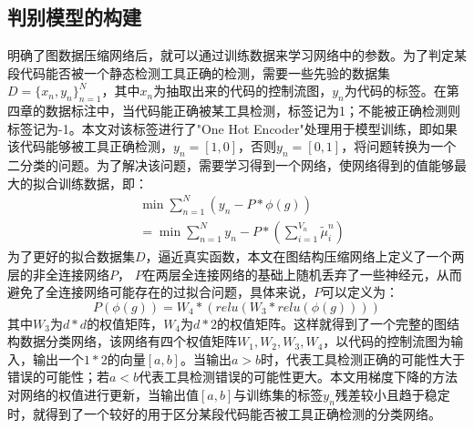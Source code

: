 \subsection{判别模型的构建}
明确了图数据压缩网络后，就可以通过训练数据来学习网络中的参数。为了判定某段代码能否被一个静态检测工具正确的检测，需要一些先验的数据集 $D=\{x_n, y_n\}_{n=1}^N$，其中$x_n$为抽取出来的代码的控制流图，$y_n$为代码的标签。在第四章的数据标注中，当代码能正确被某工具检测，标签记为1；不能被正确检测则标签记为-1。本文对该标签进行了"One Hot Encoder"处理用于模型训练，即如果该代码能够被工具正确检测，$y_n=[1, 0]$，否则$y_n=[0, 1]$，将问题转换为一个二分类的问题。为了解决该问题，需要学习得到一个网络，使网络得到的值能够最大的拟合训练数据，即：
\begin{align}
&\min \sum_{n=1}^{N} (y_n - P*\phi(g))\\
&=\min \sum_{n=1}^{N} y_n - P*(\sum_{i=1}^{V_n} \tilde{\mu}_i^n)
\end{align}
为了更好的拟合数据集$D$，逼近真实函数，本文在图结构压缩网络上定义了一个两层的非全连接网络$P$， $P$在两层全连接网络的基础上随机丢弃了一些神经元，从而避免了全连接网络可能存在的过拟合问题，具体来说，$P$可以定义为：
\begin{equation}
P(\phi(g)) = W_4*(relu(W_3*relu(\phi(g))))
\end{equation}
其中$W_3$为$d*d$的权值矩阵，$W_4$为$d*2$的权值矩阵。这样就得到了一个完整的图结构数据分类网络，该网络有四个权值矩阵$W_1, W_2, W_3, W_4$，以代码的控制流图为输入，输出一个$1*2$的向量$[a, b]$。当输出$a>b$时，代表工具检测正确的可能性大于错误的可能性；若$a<b$代表工具检测错误的可能性更大。本文用梯度下降的方法对网络的权值进行更新，当输出值$[a, b]$与训练集的标签$y_n$残差较小且趋于稳定时，就得到了一个较好的用于区分某段代码能否被工具正确检测的分类网络。

